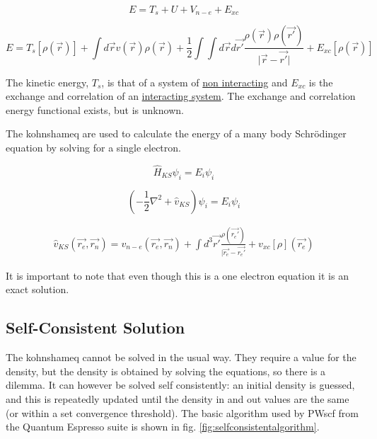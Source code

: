 \begin{equation}
E = T_{s} + U + V_{n-e} + E_{xc}
\end{equation}

\begin{equation}
E = T_{s}[\rho(\vec{r})] + \int d \vec{r} v(\vec{r}) \rho(\vec{r}) + \frac{1}{2} \int \int  d \vec{r} d \vec{r'} \frac{\rho(\vec{r}) \rho(\vec{r'}) }{\lvert \vec{r} - \vec{r'} \rvert} + E_{xc}[\rho(\vec{r})]
\end{equation}

The kinetic energy, $T_s$, is that of a system of \underline{non interacting} and $E_{xc}$ is the exchange and correlation of an \underline{interacting system}.  The exchange and correlation energy functional exists, but is unknown.  

The \Gls{kohnshameq} are used to calculate the energy of a many body Schr\"{o}dinger equation by solving for a single electron.

\begin{equation}
\hat{H}_{KS} \psi_{i} = E_{i} \psi_{i}
\label{eq:eqKS1}
\end{equation}

\begin{equation}
(-\frac{1}{2} \nabla^2 + \hat{v}_{KS}) \psi_{i} = E_{i} \psi_{i}
\label{eq:eqKS2}
\end{equation}


\begin{equation}
\begin{split}
\hat{v}_{KS}(\vec{r_e}, \vec{r_n}) = v_{n-e}(\vec{r_e}, \vec{r_n}) + \int d^3\vec{r'} \frac{\rho(\vec{r_{e}'})}{\lvert \vec{r_{e}} - \vec{r_{e}'}} + v_{xc}[\rho](\vec{r_{e}})
\end{split}
\label{eq:eqGroundState}
\end{equation}

It is important to note that even though this is a one electron equation it is an exact solution.


\subsection{Self-Consistent Solution}
\FloatBarrier

The \Gls{kohnshameq} cannot be solved in the usual way.  They require a value for the density, but the density is obtained by solving the equations, so there is a dilemma.  It can however be solved self consistently: an initial density is guessed, and this is repeatedly updated until the density in and out values are the same (or within a set convergence threshold).  The basic algorithm used by PWscf from the Quantum Espresso suite is shown in fig. \ref{fig:selfconsistentalgorithm}\cite{abcdftsissa}.



